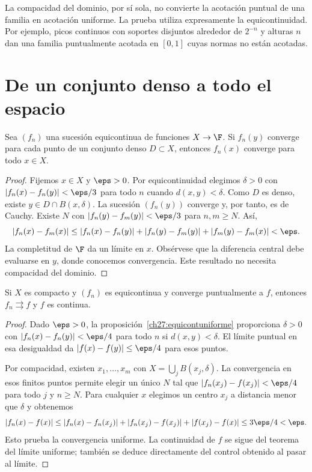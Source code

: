 La compacidad del dominio, por sí sola, no convierte la acotación puntual de una familia en acotación uniforme. La prueba utiliza expresamente la equicontinuidad. Por ejemplo, picos continuos con soportes disjuntos alrededor de $2^{-n}$ y alturas $n$ dan una familia puntualmente acotada en $[0,1]$ cuyas normas no están acotadas.

\section{De un conjunto denso a todo el espacio}
\begin{proposicion}\label{ch27:denso}
Sea $(f_n)$ una sucesión equicontinua de funciones $X\to\F$. Si $f_n(y)$ converge para cada punto de un conjunto denso $D\subset X$, entonces $f_n(x)$ converge para todo $x\in X$.
\end{proposicion}
\begin{proof}
Fijemos $x\in X$ y $\eps>0$. Por equicontinuidad elegimos $\delta>0$ con $|f_n(x)-f_n(y)|<\eps/3$ para todo $n$ cuando $d(x,y)<\delta$. Como $D$ es denso, existe $y\in D\cap B(x,\delta)$. La sucesión $(f_n(y))$ converge y, por tanto, es de Cauchy. Existe $N$ con $|f_n(y)-f_m(y)|<\eps/3$ para $n,m\ge N$. Así,
\[
 |f_n(x)-f_m(x)|\le|f_n(x)-f_n(y)|+|f_n(y)-f_m(y)|+|f_m(y)-f_m(x)|<\eps.
\]
La completitud de $\F$ da un límite en $x$. Obsérvese que la diferencia central debe evaluarse en $y$, donde conocemos convergencia. Este resultado no necesita compacidad del dominio.
\end{proof}

\begin{proposicion}\label{ch27:puntualuniforme}
Si $X$ es compacto y $(f_n)$ es equicontinua y converge puntualmente a $f$, entonces $f_n\rightrightarrows f$ y $f$ es continua.
\end{proposicion}
\begin{proof}
Dado $\eps>0$, la proposición~\ref{ch27:equicontuniforme} proporciona $\delta>0$ con $|f_n(x)-f_n(y)|<\eps/4$ para todo $n$ si $d(x,y)<\delta$. El límite puntual en esa desigualdad da $|f(x)-f(y)|\le\eps/4$ para esos puntos.

Por compacidad, existen $x_1,\ldots,x_m$ con $X=\bigcup_jB(x_j,\delta)$. La convergencia en esos finitos puntos permite elegir un único $N$ tal que $|f_n(x_j)-f(x_j)|<\eps/4$ para todo $j$ y $n\ge N$. Para cualquier $x$ elegimos un centro $x_j$ a distancia menor que $\delta$ y obtenemos
\[
 |f_n(x)-f(x)|
 \le |f_n(x)-f_n(x_j)|+|f_n(x_j)-f(x_j)|+|f(x_j)-f(x)|
 \le3\eps/4<\eps.
\]
Esto prueba la convergencia uniforme. La continuidad de $f$ se sigue del teorema del límite uniforme; también se deduce directamente del control obtenido al pasar al límite.
\end{proof}

